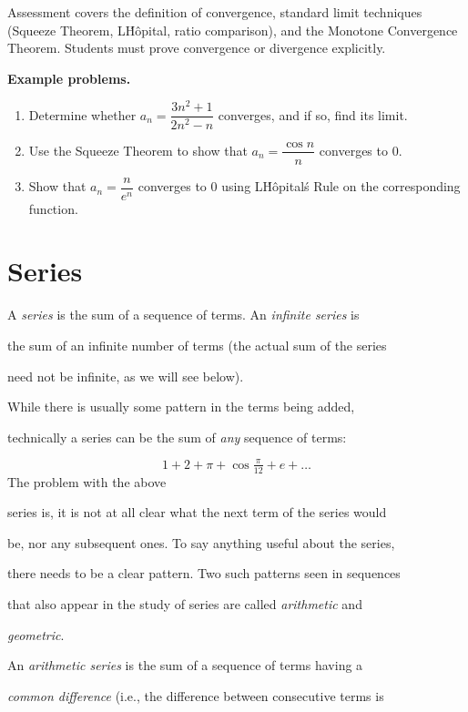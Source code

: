 Assessment covers the definition of convergence, standard limit techniques (Squeeze Theorem, L\'H\^{o}pital, ratio comparison), and the Monotone Convergence Theorem. Students must prove convergence or divergence explicitly.

\textbf{Example problems.}

\begin{enumerate}
    \item Determine whether $a_n = \dfrac{3n^2+1}{2n^2-n}$ converges, and if so, find its limit.
    \item Use the Squeeze Theorem to show that $a_n = \dfrac{\cos n}{n}$ converges to $0$.
    \item Show that $a_n = \dfrac{n}{e^n}$ converges to $0$ using L\'H\^{o}pital\'s Rule on the corresponding function.
\end{enumerate}

\section{Series}
\label{sec:series}

A \textit{series} is the sum of a sequence of terms. An \textit{infinite series} is

the sum of an infinite number of terms (the actual sum of the series

need not be infinite, as we will see below).


While there is usually some pattern in the terms being added,

technically a series can be the sum of \textit{any} sequence of terms:


\[
1+2+\pi+\cos\tfrac{\pi}{12}+e+\ldots
\] The problem with the above

series is, it is not at all clear what the next term of the series would

be, nor any subsequent ones. To say anything useful about the series,

there needs to be a clear pattern. Two such patterns seen in sequences

that also appear in the study of series are called \textit{arithmetic} and

\textit{geometric}.


An \textit{arithmetic series} is the sum of a sequence of terms having a

\textit{common difference} (i.e., the difference between consecutive terms is

